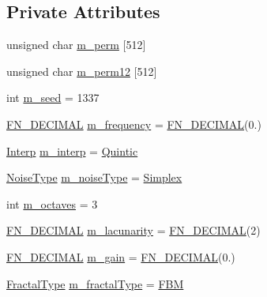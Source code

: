 \subsection*{Private Attributes}
\begin{DoxyCompactItemize}
\item 
unsigned char \mbox{\hyperlink{class_fast_noise_a194ef10678fa5c45269611f8878b6a6d}{m\+\_\+perm}} \mbox{[}512\mbox{]}
\item 
unsigned char \mbox{\hyperlink{class_fast_noise_a2b8966a5423e3cda086dbdb049f5d67a}{m\+\_\+perm12}} \mbox{[}512\mbox{]}
\item 
int \mbox{\hyperlink{class_fast_noise_a9a631ec0853f7b93df07c1e7f1d6e4f0}{m\+\_\+seed}} = 1337
\item 
\mbox{\hyperlink{_fast_noise_8h_a75a9ef6d2541c4921815b885bfd449c3}{F\+N\+\_\+\+D\+E\+C\+I\+M\+AL}} \mbox{\hyperlink{class_fast_noise_a56081fefba1dff55a03aa87e261e225a}{m\+\_\+frequency}} = \mbox{\hyperlink{_fast_noise_8h_a75a9ef6d2541c4921815b885bfd449c3}{F\+N\+\_\+\+D\+E\+C\+I\+M\+AL}}(0.)
\item 
\mbox{\hyperlink{class_fast_noise_a60969f626ea3ea3504ea51d789f19a33}{Interp}} \mbox{\hyperlink{class_fast_noise_a8549beacb9ed7edff3ae672b6c2d8244}{m\+\_\+interp}} = \mbox{\hyperlink{class_fast_noise_a60969f626ea3ea3504ea51d789f19a33a84cde29055ad9a75d38e83a87af5f778}{Quintic}}
\item 
\mbox{\hyperlink{class_fast_noise_a77adcfdc4d6e9410ef6099553509d09f}{Noise\+Type}} \mbox{\hyperlink{class_fast_noise_aa772ccfdc4a438d777fc0151e0a1dc17}{m\+\_\+noise\+Type}} = \mbox{\hyperlink{class_fast_noise_a77adcfdc4d6e9410ef6099553509d09faba24ab2c34040c17cf42aeb5f0e36f00}{Simplex}}
\item 
int \mbox{\hyperlink{class_fast_noise_a5b5e1f405c42961d0afc7f5fa6b83a81}{m\+\_\+octaves}} = 3
\item 
\mbox{\hyperlink{_fast_noise_8h_a75a9ef6d2541c4921815b885bfd449c3}{F\+N\+\_\+\+D\+E\+C\+I\+M\+AL}} \mbox{\hyperlink{class_fast_noise_af0791d639dee26ef7cfebcc23129e1f7}{m\+\_\+lacunarity}} = \mbox{\hyperlink{_fast_noise_8h_a75a9ef6d2541c4921815b885bfd449c3}{F\+N\+\_\+\+D\+E\+C\+I\+M\+AL}}(2)
\item 
\mbox{\hyperlink{_fast_noise_8h_a75a9ef6d2541c4921815b885bfd449c3}{F\+N\+\_\+\+D\+E\+C\+I\+M\+AL}} \mbox{\hyperlink{class_fast_noise_a60a3f1e6d9b69c8287e4b828148f4072}{m\+\_\+gain}} = \mbox{\hyperlink{_fast_noise_8h_a75a9ef6d2541c4921815b885bfd449c3}{F\+N\+\_\+\+D\+E\+C\+I\+M\+AL}}(0.)
\item 
\mbox{\hyperlink{class_fast_noise_a20a2d45a468fa10a7c6a94e22c2f3d30}{Fractal\+Type}} \mbox{\hyperlink{class_fast_noise_a88ff6e7299480446e075e9558fa47360}{m\+\_\+fractal\+Type}} = \mbox{\hyperlink{class_fast_noise_a20a2d45a468fa10a7c6a94e22c2f3d30a75ebe681cdebfda37508de40c47484db}{F\+BM}}

\end{DoxyCompactItemize}
